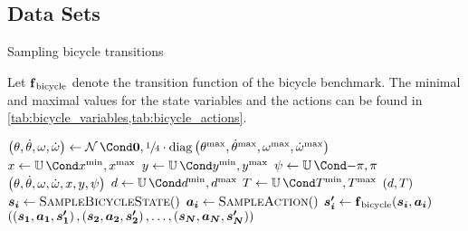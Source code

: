 \subsection{Data Sets}
\label{sub:data_sets}
\begin{algorithm}[p]
    \caption{Sampling bicycle transitions}
    \label{alg:bicycle_transitions}
    Let $\DynBicycle$ denote the transition function of the bicycle benchmark.
    The minimal and maximal values for the state variables and the actions can be found in \cref{tab:bicycle_variables,tab:bicycle_actions}.
    \begin{algorithmic}[1]
            \State $\left( \theta, \dot{\theta}, \omega, \dot{\omega} \right) \gets \Gaussian{\mat{0}, \sfrac{1}{4} \cdot \diag \left( \theta^{\text{max}}, \dot{\theta}^{\text{max}}, \omega^{\text{max}}, \dot{\omega}^{\text{max}} \right)}$
            \State $x \gets \Uniform{x^{\text{min}}, x^{\text{max}}}$
            \State $y \gets \Uniform{y^{\text{min}}, y^{\text{max}}}$
            \State $\psi \gets \Uniform{-\pi, \pi}$
            \State \Return $\Bicycle*{\theta, \dot{\theta}, \omega, \dot{\omega}, x, y, \psi}$
        \EndFunction
        \Statex
            \State $d \gets \Uniform{d^{\text{min}}, d^{\text{max}}}$
            \State $T \gets \Uniform{T^{\text{min}}, T^{\text{max}}}$
            \State \Return $\Bicycle{d, T}$
        \EndFunction
        \Statex
                \State $\mat{s_i} \gets \Call{SampleBicycleState}$
                \State $\mat{a_i} \gets \Call{SampleAction}$
                \State $\mat{s^\prime_{i}} \gets \DynBicycle(\mat{s_i}, \mat{a_i})$
            \EndFor
            \State \Return $\left( \left( \mat{s_1}, \mat{a_1}, \mat{s^\prime_1} \right), \left( \mat{s_2}, \mat{a_2}, \mat{s^\prime_2} \right), \dots, \left( \mat{s_{N}}, \mat{a_{N}}, \mat{s^\prime_{N}} \right) \right)$
        \EndFunction
    \end{algorithmic}
\end{algorithm}
